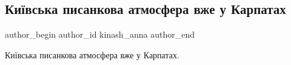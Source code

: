  
 
 
 
 

\subsection{Київська писанкова атмосфера вже у Карпатах}
\label{sec:15_04_2017.fb.kinash_anna.1.kiev_pysankova_atmosfera_karpaty}

\ifcmt
 author_begin
   author_id kinash_anna
 author_end
\fi

Київська писанкова атмосфера вже у Карпатах.
